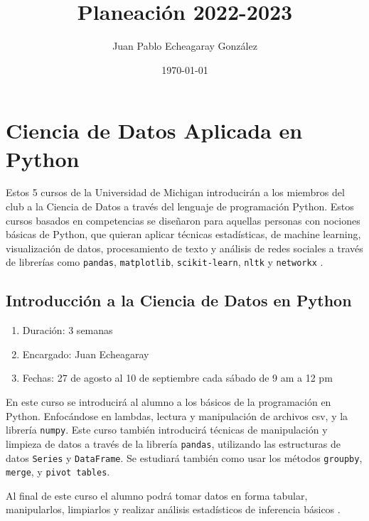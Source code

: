 \documentclass{article}
\title{Planeación 2022-2023}
\author{Juan Pablo Echeagaray González}
\date{\today}
\begin{document}
    \begin{titlepage}
        \maketitle
    \end{titlepage}

    \tableofcontents
    \clearpage

    \section{Ciencia de Datos Aplicada en Python}

        Estos 5 cursos de la Universidad de Michigan introducirán a los miembros del club a la Ciencia de Datos a través del lenguaje de programación Python. Estos cursos basados en competencias se diseñaron para aquellas personas con nociones básicas de Python, que quieran aplicar técnicas estadísticas, de machine learning, visualización de datos, procesamiento de texto y análisis de redes sociales a través de librerías como \texttt{pandas}, \texttt{matplotlib}, \texttt{scikit-learn}, \texttt{nltk} y \texttt{networkx} \cite{applied-ds}.

        \subsection{Introducción a la Ciencia de Datos en Python}

            \begin{enumerate}
                \item Duración: 3 semanas
                \item Encargado: Juan Echeagaray
                \item Fechas: 27 de agosto al 10 de septiembre cada sábado de 9 am a 12 pm
            \end{enumerate}

            En este curso se introducirá al alumno a los básicos de la programación en Python. Enfocándose en lambdas, lectura y manipulación de archivos csv, y la librería \texttt{numpy}. Este curso también introducirá técnicas de manipulación y limpieza de datos a través de la librería \texttt{pandas}, utilizando las estructuras de datos \texttt{Series} y \texttt{DataFrame}. Se estudiará también como usar los métodos \texttt{groupby}, \texttt{merge}, y \texttt{pivot tables}.

            Al final de este curso el alumno podrá tomar datos en forma tabular, manipularlos, limpiarlos y realizar análisis estadísticos de inferencia básicos \cite{intro-ds}.
\end{document}

